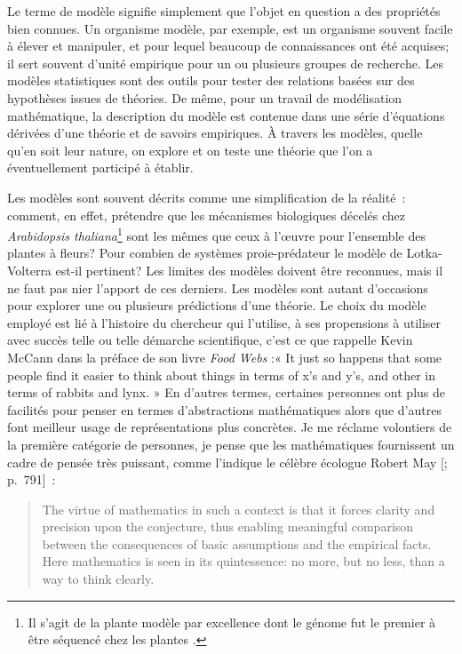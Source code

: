 Le terme de modèle signifie simplement que l'objet en question a des
propriétés bien connues. Un organisme modèle, par exemple, est un
organisme souvent facile à élever et manipuler, et pour lequel beaucoup
de connaissances ont été acquises; il sert souvent d'unité empirique
pour un ou plusieurs groupes de recherche. Les modèles statistiques sont
des outils pour tester des relations basées sur des hypothèses issues de
théories. De même, pour un travail de modélisation mathématique, la
description du modèle est contenue dans une série d'équations dérivées
d'une théorie et de savoirs empiriques. À travers les modèles, quelle
qu'en soit leur nature, on explore et on teste une théorie que l'on a
éventuellement participé à établir.

Les modèles sont souvent décrits comme une simplification de la
réalité~: comment, en effet, prétendre que les mécanismes biologiques
décelés chez \emph{Arabidopsis thaliana}\footnote{Il s'agit de la plante
  modèle par excellence dont le génome fut le premier à être séquencé
  chez les plantes \citep{TheArabidopsisGenomeInitiative2000}.} sont les
mêmes que ceux à l'œuvre pour l'ensemble des plantes à fleurs? Pour
combien de systèmes proie-prédateur le modèle de Lotka-Volterra est-il
pertinent? Les limites des modèles doivent être reconnues, mais il ne
faut pas nier l'apport de ces derniers. Les modèles sont autant
d'occasions pour explorer une ou plusieurs prédictions d'une théorie. Le
choix du modèle employé est lié à l'histoire du chercheur qui l'utilise,
à ses propensions à utiliser avec succès telle ou telle démarche
scientifique, c'est ce que rappelle Kevin McCann dans la préface de son
livre \emph{Food Webs} \citep{mccann2011food} :« It just so happens that
some people find it easier to think about things in terms of x's and
y's, and other in terms of rabbits and lynx. » En d'autres termes,
certaines personnes ont plus de facilités pour penser en termes
d'abstractions mathématiques alors que d'autres font meilleur usage de
représentations plus concrètes. Je me réclame volontiers de la première
catégorie de personnes, je pense que les mathématiques fournissent un
cadre de pensée très puissant, comme l'indique le célèbre écologue
Robert May {[}\citet{May2004}; p.~791{]}~:

\begin{quote}
The virtue of mathematics in such a context is that it forces clarity
and precision upon the conjecture, thus enabling meaningful comparison
between the consequences of basic assumptions and the empirical facts.
Here mathematics is seen in its quintessence: no more, but no less, than
a way to think clearly.
\end{quote}

